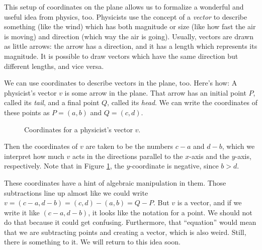 \documentclass[00-livre-main.tex]{subfiles}
\begin{document}
This setup of coordinates on the plane allows us to formalize a wonderful and useful idea from physics, too.
Physicists use the concept of a \emph{vector} to describe something (like the wind) which has both magnitude or size (like how fast the air is moving)  and direction (which way the air is going).
Usually, vectors are drawn as little arrows: the arrow has a direction, and it has a length which represents its magnitude.
It is possible to draw vectors which have the same direction but different lengths, and vice versa.

We can use coordinates to describe vectors in the plane, too.
Here's how: A physicist's vector $v$ is some arrow in the plane.
That arrow has an initial point $P$, called its \emph{tail}, and a final point $Q$, called its \emph{head}.
We can write the coordinates of these points as $P = (a,b)$ and $Q = (c,d)$.

\begin{figure}[h]
\centering
{}
\caption{Coordinates for a physicist's vector $v$.}
\label{fig:phys-vec-coords}
\end{figure}


Then the coordinates of $v$ are taken to be the numbers $c-a$ and  $d-b$, which we interpret how much $v$ acts in the directions parallel to the $x$-axis and the $y$-axis, respectively.
Note that in Figure \ref{fig:phys-vec-coords}, the $y$-coordinate is negative, since $b>d$.

These coordinates have a hint of algebraic manipulation in them.
Those subtractions line up almost like we could write $v =(c-a,d-b) = (c,d)-(a,b) = Q-P$.
But $v$ is a vector, and if we write it like $(c-a,d-b)$, it looks like the notation for a point.
We should not do that because it could get confusing.
Furthermore, that ``equation'' would mean that we are subtracting points and creating a vector, which is also weird.
Still, there is something to it.
We will return to this idea soon.
\end{document}
